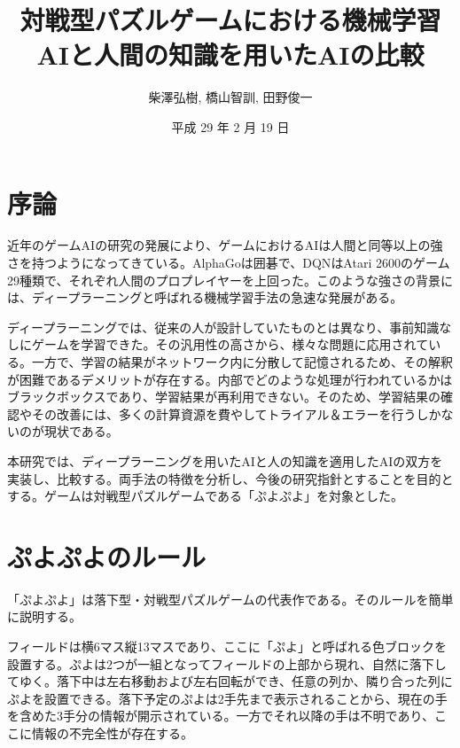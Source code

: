 \documentclass[twocolumn, a4paper]{UECIEresume}
\title{対戦型パズルゲームにおける機械学習AIと人間の知識を用いたAIの比較}
\date{平成 29 年 2 月 19 日}
\affiliation{総合情報学科}
\author{柴澤弘樹, 橋山智訓, 田野俊一}
\begin{document}
\maketitle

\section{序論}
近年のゲームAIの研究の発展により、ゲームにおけるAIは人間と同等以上の強さを持つようになってきている。AlphaGo\cite{alphaGo}は囲碁で、DQN\cite{dqn}はAtari 2600のゲーム29種類で、それぞれ人間のプロプレイヤーを上回った。このような強さの背景には、ディープラーニングと呼ばれる機械学習手法の急速な発展がある。

ディープラーニングでは、従来の人が設計していたものとは異なり、事前知識なしにゲームを学習できた。その汎用性の高さから、様々な問題に応用されている。一方で、学習の結果がネットワーク内に分散して記憶されるため、その解釈が困難であるデメリットが存在する。内部でどのような処理が行われているかはブラックボックスであり、学習結果が再利用できない。そのため、学習結果の確認やその改善には、多くの計算資源を費やしてトライアル＆エラーを行うしかないのが現状である。


本研究では、ディープラーニングを用いたAIと人の知識を適用したAIの双方を実装し、比較する。両手法の特徴を分析し、今後の研究指針とすることを目的とする。ゲームは対戦型パズルゲームである「ぷよぷよ」を対象とした。


\section{ぷよぷよのルール}
「ぷよぷよ」は落下型・対戦型パズルゲームの代表作である。そのルールを簡単に説明する。

フィールドは横6マス縦13マスであり、ここに「ぷよ」と呼ばれる色ブロックを設置する。ぷよは2つが一組となってフィールドの上部から現れ、自然に落下してゆく。落下中は左右移動および左右回転ができ、任意の列か、隣り合った列にぷよを設置できる。落下予定のぷよは2手先まで表示されることから、現在の手を含めた3手分の情報が開示されている。一方でそれ以降の手は不明であり、ここに情報の不完全性が存在する。
\end{document}
